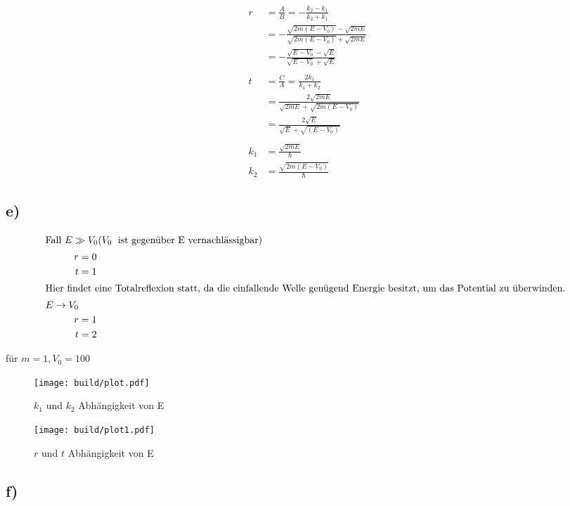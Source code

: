     \begin{align*}
        r  &= \frac{A}{B} = -\frac{k_2-k_1}{k_2+k_1}\\
        &= -\frac{\sqrt{2m(E-V_0)} - \sqrt{2mE}}{\sqrt{2m(E-V_0)} + \sqrt{2mE}}\\
        &= -\frac{\sqrt{E-V_0} - \sqrt{E}}{\sqrt{E-V_0} + \sqrt{E}}\\
        \\
        t &= \frac{C}{A} = \frac{2k_1}{k_1 + k_2}\\
        &= \frac{2\sqrt{2mE}}{\sqrt{2mE} + \sqrt{2m(E-V_0)}}\\
        &= \frac{2\sqrt{E}}{\sqrt{E} + \sqrt{(E-V_0)}}\\
        \\
        k_1 &= \frac{\sqrt{2mE}}{\hbar}\\
        k_2 &= \frac{\sqrt{2m(E-V_0)}}{\hbar}
    \end{align*}

\subsection{e)}

    \begin{align*}
        \intertext{Fall $E \gg V_0  (V_0\;$ ist gegenüber E vernachlässigbar)
        }
        r &= 0\\
        t &= 1\\
        \intertext{Hier findet eine Totalreflexion statt, da die einfallende Welle genügend Energie besitzt, um
        das Potential zu überwinden.
        }
        E \rightarrow V_0\\
        r &= 1\\
        t &= 2
    \end{align*}

     
    \justifying für $m=1, V_0 =100$
    \begin{figure}[H]
        \centering
        \texttt{[image: build/plot.pdf]}
        \caption{$k_1$ und $k_2$ Abhängigkeit von E}
    \end{figure}
    \begin{figure}[H]
        \centering
        \texttt{[image: build/plot1.pdf]}
        \caption{$r$ und $t$ Abhängigkeit von E}
    \end{figure}
\subsection{f)}

